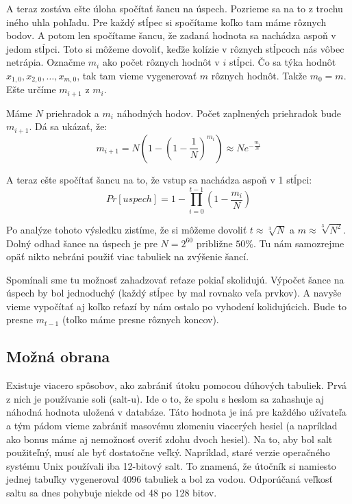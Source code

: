 A teraz zostáva ešte úloha spočítať šancu na úspech.
Pozrieme sa na to z trochu iného uhla pohľadu.
Pre každý stĺpec si spočítame koľko tam máme rôznych bodov.
A potom len spočítame šancu, že zadaná hodnota sa nachádza aspoň v
jedom stĺpci.
Toto si môžeme dovoliť, keďže
kolízie v rôznych stĺpcoch nás vôbec netrápia. 
Označme $m_i$ ako počet rôznych hodnôt v $i$ stĺpci.
Čo sa týka hodnôt $x_{1,0}, x_{2,0}, \dots, x_{m,0}$,
tak tam vieme vygenerovať $m$ rôznych hodnôt.
Takže $m_0 = m$. Ešte určíme $m_{i+1}$ z $m_i$.

Máme $N$ priehradok a $m_i$ náhodných hodov.
Počet zaplnených priehradok bude $m_{i+1}$. 
Dá sa ukázať, že:
\begin{equation*}
    m_{i+1} = N \left ( 1 - \left(1 - \frac{1}{N}\right)^{m_i} \right ) 
        \approx N e^{-\frac{m_i}{N}}
\end{equation*}

A teraz ešte spočítať šancu na to, že vstup sa nachádza aspoň v 1 stĺpci:
\begin{equation*}
    Pr[uspech] = 1 - \prod_{i=0}^{t-1} \left (1 - \frac{m_i}{N} \right)
\end{equation*}

Po analýze tohoto výsledku zistíme, že si môžeme dovoliť
$t \approx \sqrt[3]{N}$ a $m \approx \sqrt[3]{N^2}$.
Dolný odhad šance na úspech je pre $N=2^{60}$ približne $50\%$.
Tu nám samozrejme opäť nikto nebráni použiť viac tabuliek na zvýšenie šancí.

\begin{poznamka}
    Spomínali sme tu možnosť zahadzovať reťaze pokiaľ skolidujú.
    Výpočet šance na úspech by bol jednoduchý 
    (každý stĺpec by mal rovnako veľa prvkov).
    A navyše vieme vypočítať aj koľko reťazí by nám ostalo 
    po vyhodení kolidujúcich.
    Bude to presne $m_{t-1}$ (toľko máme presne rôznych koncov).
\end{poznamka}

\subsection{Možná obrana}

Existuje viacero spôsobov, ako zabrániť útoku pomocou dúhových
tabuliek. Prvá z nich je používanie soli (salt-u). Ide o to, že spolu
s heslom sa zahashuje aj náhodná hodnota uložená v databáze. Táto
hodnota je iná pre každého užívateľa a tým pádom vieme zabrániť
masovému zlomeniu viacerých hesiel (a napríklad ako bonus máme aj
nemožnosť overiť zdohu dvoch hesiel). Na to, aby bol salt použiteľný,
musí ale byť dostatočne veľký. Napríklad, staré verzie operačného
systému Unix používali iba 12-bitový salt. To znamená, že útočník si
namiesto jednej tabuľky vygeneroval 4096 tabuliek a bol za vodou.
Odporúčaná veľkosť saltu sa dnes pohybuje niekde od 48 po 128 bitov.

